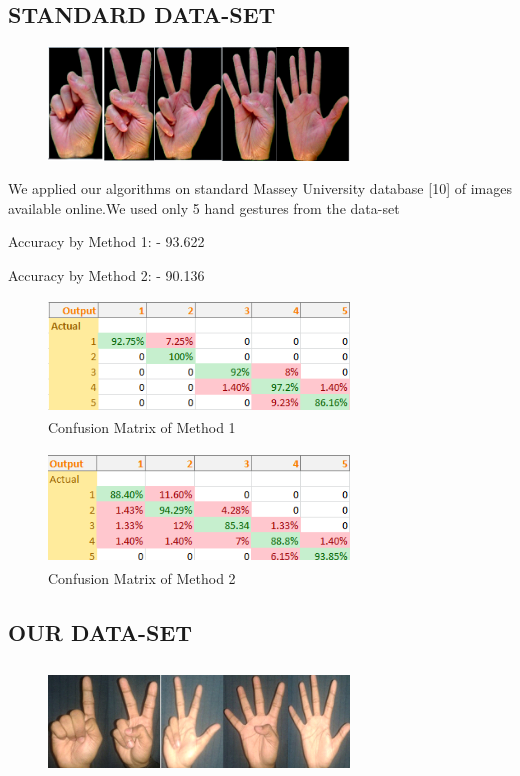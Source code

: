 \documentclass[conference]{IEEEtran}
\begin{document}
\subsection{STANDARD DATA-SET}
\begin{figure}[h!]
	\centering
	\includegraphics[width = 8cm, height = 3cm]{StandardDataset1}
\end{figure}
We applied our algorithms on standard Massey University database [10] of images available online.We used only 5 hand gestures from the data-set

Accuracy by Method 1: - 93.622%

Accuracy by Method 2: - 90.136%

\begin{figure}[h!]
	\centering
	\includegraphics[width = 8cm, height = 3cm]{cof1_1}
	\caption{Confusion Matrix of Method 1}
\end{figure}

\begin{figure}[h!]
	\centering
	\includegraphics[width = 8cm, height = 3cm]{cof1_2}
	\caption{Confusion Matrix of Method 2}
\end{figure}


\subsection{OUR DATA-SET}
\begin{figure}[h!]
	\centering
	\includegraphics[width = 8cm, height = 3cm]{ourdataset}
\end{figure}
\end{document}
